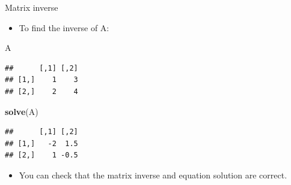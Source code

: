 \documentclass[
  ignorenonframetext,
]{beamer}
\newenvironment{Shaded}{\begin{snugshade}}{\end{snugshade}}
\newcommand{\KeywordTok}[1]{\textcolor[rgb]{0.13,0.29,0.53}{\textbf{#1}}}
\newcommand{\NormalTok}[1]{#1}
\providecommand{\tightlist}{%
  \setlength{\itemsep}{0pt}\setlength{\parskip}{0pt}}
\begin{document}
\begin{frame}[fragile]{Matrix inverse}
\protect\hypertarget{matrix-inverse}{}

\begin{itemize}
\tightlist
\item
  To find the inverse of A:
\end{itemize}

\begin{Shaded}
\begin{Highlighting}[]
\NormalTok{A}
\end{Highlighting}
\end{Shaded}

\begin{verbatim}
##      [,1] [,2]
## [1,]    1    3
## [2,]    2    4
\end{verbatim}

\begin{Shaded}
\begin{Highlighting}[]
\KeywordTok{solve}\NormalTok{(A)}
\end{Highlighting}
\end{Shaded}

\begin{verbatim}
##      [,1] [,2]
## [1,]   -2  1.5
## [2,]    1 -0.5
\end{verbatim}

\begin{itemize}
\tightlist
\item
  You can check that the matrix inverse and equation solution are
  correct.
\end{itemize}

\end{frame}
\end{document}
